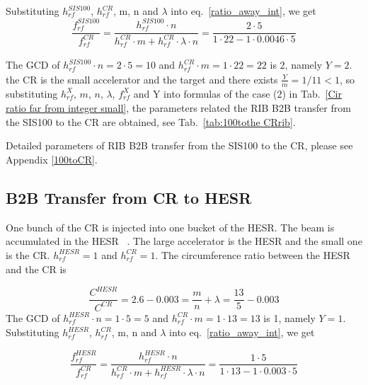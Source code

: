 Substituting $h^{\mathit{SIS100}}_\mathit{rf}$, $h^{\mathit{CR}}_\mathit{rf}$, m, n and $\lambda$ into eq.~\ref{ratio_away_int}, we get
\begin{equation} 
\frac{f_{\mathit{rf}}^{\mathit{SIS100}}}{f_{\mathit{rf}}^{\mathit{CR}}}=\frac{h^{\mathit{SIS100}}_\mathit{rf}\cdot n}{h^{\mathit{CR}}_\mathit{rf} \cdot m+ h^{\mathit{CR}}_\mathit{rf} \cdot\lambda\cdot n}=\frac{2\cdot 5}{1 \cdot 22- 1 \cdot0.0046\cdot 5}
\end{equation}

The GCD of $h^{\mathit{SIS100}}_\mathit{rf}\cdot n=2\cdot5=10$ and $h^{\mathit{CR}}_\mathit{rf} \cdot m=1\cdot 22=22$ is 2, namely $Y=2$. the CR is the small accelerator and the target and there exists $\frac{Y}{m}=1/11<1$, so substituting $h^X_\mathit{rf}$, $m$, $n$, $\lambda$, $f_{\mathit{rf}}^{X}$ and Y into formulas of the case (2) in Tab.~\ref{Cir ratio far from integer small}, the parameters related the RIB B2B transfer from the SIS100 to the CR are obtained, see Tab.~\ref{tab:100tothe CRrib}.


Detailed parameters of RIB B2B transfer from the SIS100 to the CR, please see Appendix \ref{100toCR}.

\subsection{B2B Transfer from CR to HESR} 
\label{B2B_CR_HESR}
One bunch of the CR is injected into one bucket of the HESR. The beam is accumulated in the HESR ~\cite{toelle_hesr_2007}. The large accelerator is the HESR and the small one is the CR. $h^{\mathit{HESR}}_\mathit{rf}=1$ and $h^{\mathit{CR}}_\mathit{rf}=1$. The circumference ratio between the HESR and the CR is

\begin{equation}
\frac{C^{\mathit{HESR}}}{C^{\mathit{CR}}}=2.6-0.003=\frac{m}{n}+ \lambda = \frac{13}{5}-0.003
\end{equation}
The GCD of $h^{\mathit{HESR}}_\mathit{rf}\cdot n=1\cdot5=5$ and $h^{\mathit{CR}}_\mathit{rf} \cdot m=1\cdot 13=13$ is 1, namely $Y=1$. Substituting $h^{\mathit{HESR}}_\mathit{rf}$, $h^{\mathit{CR}}_\mathit{rf}$, m, n and $\lambda$ into eq.~\ref{ratio_away_int}, we get

\begin{equation} 
\frac{f_{\mathit{rf}}^{\mathit{HESR}}}{f_{\mathit{rf}}^{\mathit{CR}}}=\frac{h^{\mathit{HESR}}_\mathit{rf}\cdot n}{h^{\mathit{CR}}_\mathit{rf} \cdot m+ h^{\mathit{HESR}}_\mathit{rf} \cdot\lambda\cdot n}=\frac{1\cdot 5}{1 \cdot 13- 1 \cdot 0.003\cdot 5}
\end{equation}


